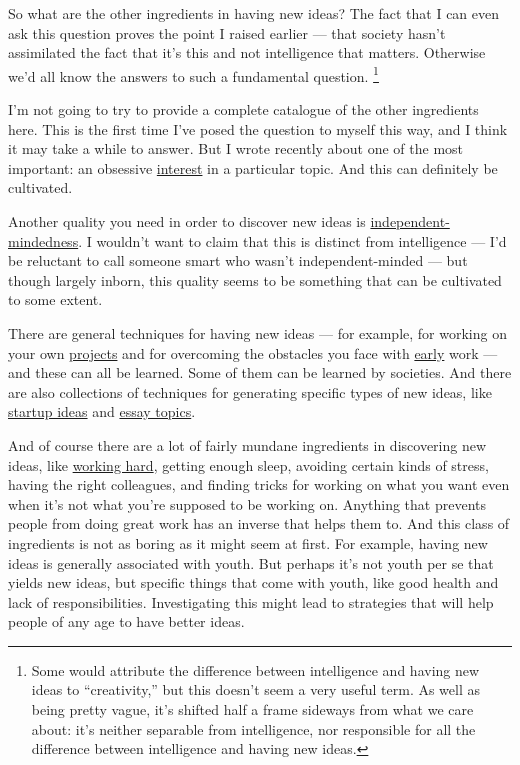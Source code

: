 \documentclass[12pt]{book}
\begin{document}
So what are the other ingredients in having new ideas? The fact that I
can even ask this question proves the point I raised earlier --- that
society hasn't assimilated the fact that it's this and not intelligence
that matters. Otherwise we'd all know the answers to such a fundamental
question. \footnote{Some would attribute the difference between intelligence and
having new ideas to ``creativity,'' but this doesn't seem a very useful
term. As well as being pretty vague, it's shifted half a frame sideways
from what we care about: it's neither separable from intelligence, nor
responsible for all the difference between intelligence and having new
ideas.}

I'm not going to try to provide a complete catalogue of the other
ingredients here. This is the first time I've posed the question to
myself this way, and I think it may take a while to answer. But I wrote
recently about one of the most important: an obsessive
\href{genius.html}{interest} in a particular topic. And this can
definitely be cultivated.

Another quality you need in order to discover new ideas is
\href{think.html}{independent-mindedness}. I wouldn't want to claim that
this is distinct from intelligence --- I'd be reluctant to call someone
smart who wasn't independent-minded --- but though largely inborn, this
quality seems to be something that can be cultivated to some extent.

There are general techniques for having new ideas --- for example, for
working on your own \href{own.html}{projects} and for overcoming the
obstacles you face with \href{early.html}{early} work --- and these can
all be learned. Some of them can be learned by societies. And there are
also collections of techniques for generating specific types of new
ideas, like \href{startupideas.html}{startup ideas} and
\href{essay.html}{essay topics}.

And of course there are a lot of fairly mundane ingredients in
discovering new ideas, like \href{hwh.html}{working hard}, getting
enough sleep, avoiding certain kinds of stress, having the right
colleagues, and finding tricks for working on what you want even when
it's not what you're supposed to be working on. Anything that prevents
people from doing great work has an inverse that helps them to. And this
class of ingredients is not as boring as it might seem at first. For
example, having new ideas is generally associated with youth. But
perhaps it's not youth per se that yields new ideas, but specific things
that come with youth, like good health and lack of responsibilities.
Investigating this might lead to strategies that will help people of any
age to have better ideas.
\end{document}
